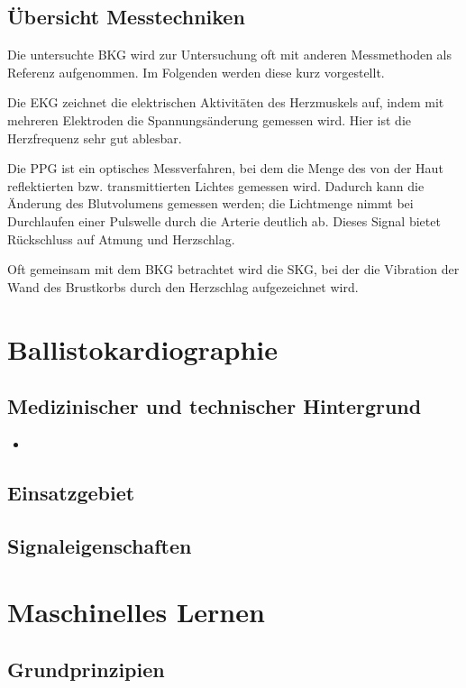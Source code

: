 	\subsection{Übersicht Messtechniken}
	
	Die untersuchte \ac{BKG} wird zur Untersuchung oft mit anderen Messmethoden als Referenz aufgenommen. Im Folgenden werden diese kurz vorgestellt.
	
	Die \ac{EKG} zeichnet die elektrischen Aktivitäten des Herzmuskels auf, indem mit mehreren Elektroden die Spannungsänderung gemessen wird. Hier ist die Herzfrequenz sehr gut ablesbar.
	
	Die \ac{PPG} ist ein optisches Messverfahren, bei dem die Menge des von der Haut reflektierten bzw. transmittierten Lichtes gemessen wird. Dadurch kann die Änderung des Blutvolumens gemessen werden; die Lichtmenge nimmt bei Durchlaufen einer Pulswelle durch die Arterie deutlich ab. Dieses Signal bietet Rückschluss auf Atmung und Herzschlag.
	
	Oft gemeinsam mit dem \ac{BKG} betrachtet wird die \ac{SKG}, bei der die Vibration der Wand des Brustkorbs durch den Herzschlag aufgezeichnet wird.

	\section{Ballistokardiographie}
	
	\subsection{Medizinischer und technischer Hintergrund}
	
	\begin{itemize}
		\item 
	\end{itemize}
	
	\subsection{Einsatzgebiet}
	\subsection{Signaleigenschaften}
	

\section{Maschinelles Lernen}

	\subsection{Grundprinzipien}
	
